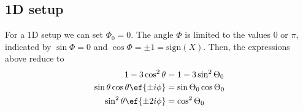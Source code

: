 
\subsection{1D setup}
For a 1D setup we can set $\Phi_0=0$. The angle $\Phi$ is limited
to the values $0$ or $\pi$, indicated by $\sin\Phi=0$ and
$\cos\Phi=\pm 1=\text{sign}(X)$. Then, the expressions above reduce to
\begin{align}
    1-3\cos^2\theta &= 1-3\sin^2\Theta_0 \\
    \sin\theta\cos\theta \ef{\pm i\phi} &= \sin\Theta_0 \cos\Theta_0 \\
    \sin^2\theta \ef{\pm 2i\phi} &= \cos^2 \Theta_0
\end{align}

